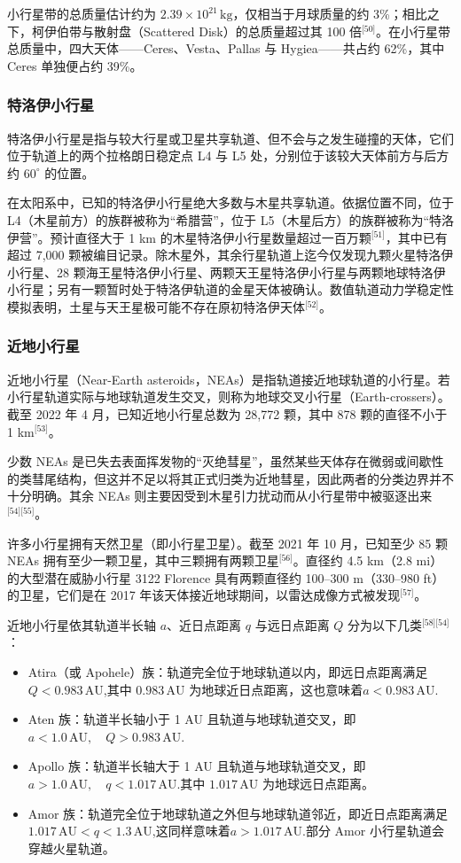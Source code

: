 小行星带的总质量估计约为 \(2.39\times10^{21}\,\mathrm{kg}\)，仅相当于月球质量的约 3\%；相比之下，柯伊伯带与散射盘（Scattered Disk）的总质量超过其 100 倍\(^\text{[50]}\)。在小行星带总质量中，四大天体——Ceres、Vesta、Pallas 与 Hygiea——共占约 62\%，其中 Ceres 单独便占约 39\%。
\subsubsection{特洛伊小行星}  
特洛伊小行星是指与较大行星或卫星共享轨道、但不会与之发生碰撞的天体，它们位于轨道上的两个拉格朗日稳定点 L4 与 L5 处，分别位于该较大天体前方与后方约 \(60^\circ\) 的位置。

在太阳系中，已知的特洛伊小行星绝大多数与木星共享轨道。依据位置不同，位于 L4（木星前方）的族群被称为“希腊营”，位于 L5（木星后方）的族群被称为“特洛伊营”。预计直径大于 1 km 的木星特洛伊小行星数量超过一百万颗\(^\text{[51]}\)，其中已有超过 7{,}000 颗被编目记录。除木星外，其余行星轨道上迄今仅发现九颗火星特洛伊小行星、28 颗海王星特洛伊小行星、两颗天王星特洛伊小行星与两颗地球特洛伊小行星；另有一颗暂时处于特洛伊轨道的金星天体被确认。数值轨道动力学稳定性模拟表明，土星与天王星极可能不存在原初特洛伊天体\(^\text{[52]}\)。
\subsubsection{近地小行星}
近地小行星（Near-Earth asteroids，NEAs）是指轨道接近地球轨道的小行星。若小行星轨道实际与地球轨道发生交叉，则称为地球交叉小行星（Earth-crossers）。截至 2022 年 4 月，已知近地小行星总数为 28{,}772 颗，其中 878 颗的直径不小于 1 km\(^\text{[53]}\)。

少数 NEAs 是已失去表面挥发物的“灭绝彗星”，虽然某些天体存在微弱或间歇性的类彗尾结构，但这并不足以将其正式归类为近地彗星，因此两者的分类边界并不十分明确。其余 NEAs 则主要因受到木星引力扰动而从小行星带中被驱逐出来\(^\text{[54][55]}\)。

许多小行星拥有天然卫星（即小行星卫星）。截至 2021 年 10 月，已知至少 85 颗 NEAs 拥有至少一颗卫星，其中三颗拥有两颗卫星\(^\text{[56]}\)。直径约 4.5 km（2.8 mi）的大型潜在威胁小行星 3122 Florence 具有两颗直径约 100–300 m（330–980 ft）的卫星，它们是在 2017 年该天体接近地球期间，以雷达成像方式被发现\(^\text{[57]}\)。

近地小行星依其轨道半长轴 \(a\)、近日点距离 \(q\) 与远日点距离 \(Q\) 分为以下几类\(^\text{[58][54]}\)：
\begin{itemize}
\item Atira（或 Apohele）族：轨道完全位于地球轨道以内，即远日点距离满足\( Q < 0.983\,\mathrm{AU}\),其中 \(0.983\,\mathrm{AU}\) 为地球近日点距离，这也意味着\(a < 0.983\,\mathrm{AU}\).
\item Aten 族：轨道半长轴小于 1 AU 且轨道与地球轨道交叉，即\(a < 1.0\,\mathrm{AU},\quad Q > 0.983\,\mathrm{AU}\).
\item Apollo 族：轨道半长轴大于 1 AU 且轨道与地球轨道交叉，即\(a > 1.0\,\mathrm{AU},\quad q < 1.017\,\mathrm{AU}\).其中 \(1.017\,\mathrm{AU}\) 为地球远日点距离。
\item Amor 族：轨道完全位于地球轨道之外但与地球轨道邻近，即近日点距离满足\(1.017\,\mathrm{AU} < q < 1.3\,\mathrm{AU}\),这同样意味着\(a > 1.017\,\mathrm{AU}\).部分 Amor 小行星轨道会穿越火星轨道。
\end{itemize}
